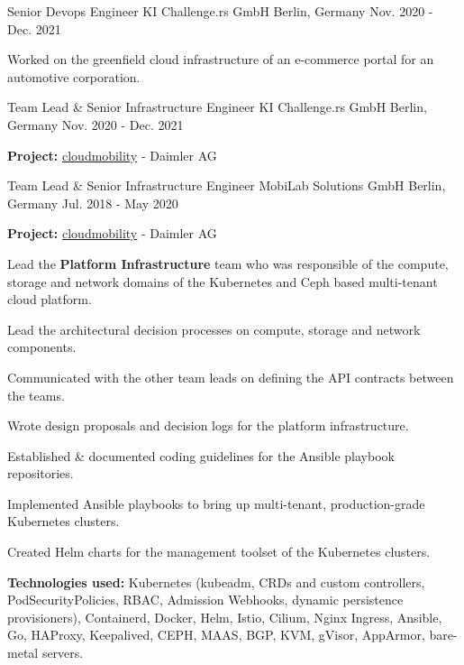 
\begin{cventries}

    \cventry
    {Senior Devops Engineer}
    {KI Challenge.rs GmbH}
    {Berlin, Germany}
    {Nov. 2020 - Dec. 2021}
    {
        \begin{cvitems}
            \item Worked on the greenfield cloud infrastructure of an e-commerce portal for an automotive corporation.
        \end{cvitems}
    }

    \cventry
    {Team Lead \& Senior Infrastructure Engineer}
    {KI Challenge.rs GmbH}
    {Berlin, Germany}
    {Nov. 2020 - Dec. 2021}
    {
        \begin{cvitems}
            \item {\textbf{Project:} \href{https://cloudmobility.io}{cloudmobility} - Daimler AG}
        \end{cvitems}
    }

    \cventry
    {Team Lead \& Senior Infrastructure Engineer}
    {MobiLab Solutions GmbH}
    {Berlin, Germany}
    {Jul. 2018 - May 2020}
    {
    \begin{cvitems}
        \item {\textbf{Project:} \href{https://cloudmobility.io}{cloudmobility} - Daimler AG}
        \newline
        \item {Lead the \textbf{Platform Infrastructure} team who was responsible of the compute,
        storage and network domains of the Kubernetes and Ceph based multi-tenant cloud platform.}
        \item {Lead the architectural decision processes on compute, storage and network components.}
        \item {Communicated with the other team leads on defining the API contracts between the teams.}
        \item {Wrote design proposals and decision logs for the platform infrastructure.}
        \item {Established \& documented coding guidelines for the Ansible playbook repositories.}
        \item {Implemented Ansible playbooks to bring up multi-tenant, production-grade Kubernetes clusters.}
        \item {Created Helm charts for the management toolset of the Kubernetes clusters.}
        \smallskip
        \item {
        \textbf{Technologies used:} Kubernetes (kubeadm, CRDs and custom controllers,
        PodSecurityPolicies, RBAC, Admission Webhooks, dynamic persistence provisioners),
        Containerd, Docker, Helm, Istio, Cilium, Nginx Ingress, Ansible, Go,
        HAProxy, Keepalived, CEPH, MAAS, BGP, KVM, gVisor, AppArmor, bare-metal servers.
        }
    \end{cvitems}
    }


\end{cventries}
